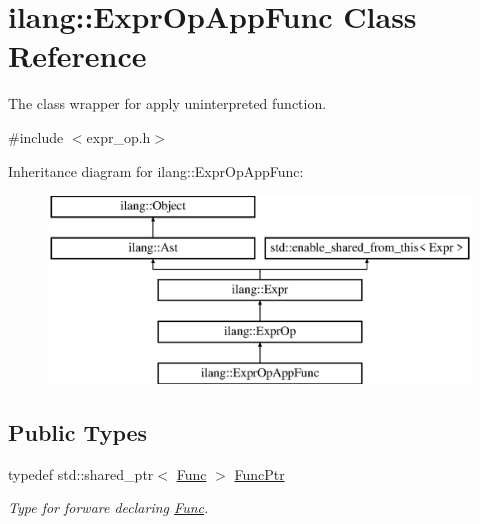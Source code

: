 \hypertarget{classilang_1_1_expr_op_app_func}{}\section{ilang\+:\+:Expr\+Op\+App\+Func Class Reference}
\label{classilang_1_1_expr_op_app_func}


The class wrapper for apply uninterpreted function.  




{\ttfamily \#include $<$expr\+\_\+op.\+h$>$}

Inheritance diagram for ilang\+:\+:Expr\+Op\+App\+Func\+:\begin{figure}[H]
\begin{center}
\leavevmode
\includegraphics[height=5.000000cm]{classilang_1_1_expr_op_app_func}
\end{center}
\end{figure}
\subsection*{Public Types}
\begin{DoxyCompactItemize}
\item 
\mbox{\label{classilang_1_1_expr_op_app_func_a979ae4696cdcab50159f2a99a410a612}} 
typedef std\+::shared\+\_\+ptr$<$ \mbox{\hyperlink{classilang_1_1_func}{Func}} $>$ \mbox{\hyperlink{classilang_1_1_expr_op_app_func_a979ae4696cdcab50159f2a99a410a612}{Func\+Ptr}}
\begin{DoxyCompactList}\small\item\em Type for forware declaring \mbox{\hyperlink{classilang_1_1_func}{Func}}. \end{DoxyCompactList}\end{DoxyCompactItemize}
